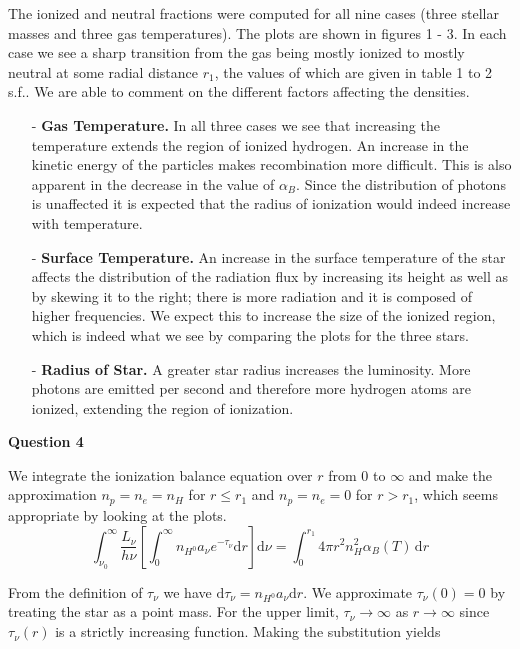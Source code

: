 \documentclass[12pt]{extarticle}
\begin{document}
The ionized and neutral fractions were computed for all nine cases (three stellar masses and three gas temperatures). The plots are shown in figures 1 - 3. In each case we see a sharp transition from the gas being mostly ionized to mostly neutral at some radial distance $r_1$, the values of which are given in table 1 to 2 s.f.. We are able to comment on the different factors affecting the densities.
\begin{itemize}
\item[-]\textbf{Gas Temperature.} In all three cases we see that increasing the temperature extends the region of ionized hydrogen. An increase in the kinetic energy of the particles makes recombination more difficult. This is also apparent in the decrease in the value of $\alpha_B$. Since the distribution of photons is unaffected  it is expected that the radius of ionization would indeed increase with temperature.
\item[-]\textbf{Surface Temperature.} An increase in the surface temperature of the star affects the distribution of the radiation flux by increasing its height as well as by skewing it to the right; there is more radiation and it is composed of higher frequencies. We expect this to increase the size of the ionized region, which is indeed what we see by comparing the plots for the three stars.
\item[-]
\textbf{Radius of Star.} A greater star radius increases the luminosity. More photons are emitted per second and therefore more hydrogen atoms are ionized, extending the region of ionization.\\
\end{itemize}

\begin{center}
\textbf{Question 4}
\end{center}

We integrate the ionization balance equation over $r$ from $0$ to $\infty$ and make the approximation $n_p = n_e = n_H$ for $r\leq r_1$ and $n_p=n_e = 0$ for $r>r_1$, which seems appropriate by looking at the plots.  
$$\int_{\nu_0}^{\infty}\frac{L_{\nu}}{h\nu}\left[\int_0^{\infty}n_{H^0}a_{\nu}e^{-\tau_{\nu}}\mathrm{d}r\right]\mathrm{d}\nu = \int_0^{r_1}4\pi r^2 n_H^2 \alpha_B(T)\,\mathrm{d}r$$

From the definition of $\tau_{\nu}$ we have $\mathrm{d}\tau_{\nu}  = n_{H^0}a_{\nu}\mathrm{d}r$. We approximate $\tau_{\nu}(0) = 0$ by treating the star as a point mass. For the upper limit, $\tau_{\nu} \rightarrow  \infty$ as $r \rightarrow \infty$ since $\tau_{\nu}(r)$ is a strictly increasing function. Making the substitution yields
\end{document}
